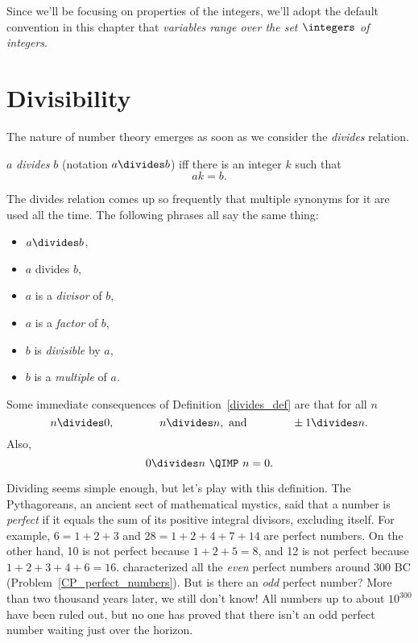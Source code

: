 
Since we'll be focusing on properties of the integers, we'll adopt the
default convention in this chapter that \emph{variables range over
  the set $\integers$ of integers}.

\section{Divisibility}\label{divisibility_sec}

The nature of number theory emerges as soon as we consider the \emph{divides}%
relation.
\begin{definition}\label{divides_def}
$a$ \emph{divides} $b$ (notation $a \divides b$) iff there is an integer $k$ such that
\[
ak = b.
\]
\end{definition}
The divides relation comes up so frequently that multiple synonyms for it are used all the
time.  The following phrases all say the same thing:
\begin{itemize}
\item $a \divides b$,
\item $a$ divides $b$,
\item $a$ is a \emph{divisor} of $b$,
\item $a$ is a \emph{factor} of $b$,
\item $b$ is \emph{divisible} by $a$,
\item $b$ is a \emph{multiple} of $a$.
\end{itemize}
Some immediate consequences of Definition~\ref{divides_def} are that for
all $n$
\[
n  \divides 0,\qquad\qquad
n  \divides n, \text{ and}\qquad\qquad
\pm1  \divides n.
\]
Also,
\[
0 \divides n\ \QIMP\ n = 0.
\]

Dividing seems simple enough, but let's play with this definition.  The Pythagoreans, an
ancient sect of mathematical mystics, said that a number is \emph{perfect}%
if it equals the sum of its positive 
integral divisors, excluding itself.  For example, $6 = 1 + 2 + 3$ 
and $28 = 1 + 2 + 4 + 7 + 14$ are perfect numbers.
On the other hand, 10 is not perfect because 
$1 + 2 + 5 = 8$, and 12 is not perfect because
$1 + 2 + 3 + 4 + 6 = 16$.   characterized all the 
\emph{even} perfect numbers
around 300 BC (Problem~\ref{CP_perfect_numbers}).  But is there an \emph{odd} perfect
number?  More than two thousand years later, we still don't know!  
All numbers up to about
$10^{300}$ have been ruled out, but no one has proved that there isn't an odd perfect
number waiting just over the horizon.

